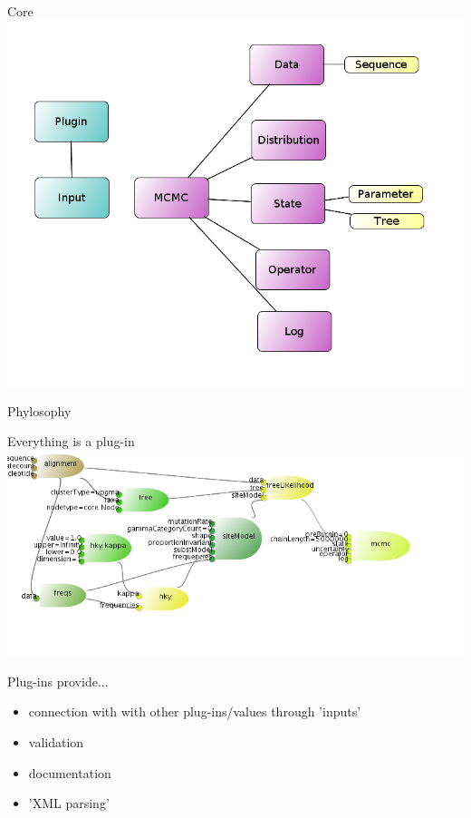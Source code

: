 \documentclass{beamer}
\theoremstyle{definition}
\begin{document}
\begin{frame}{Core}
\includegraphics[width=\textwidth]{BEAST.png}
\end{frame}

\begin{frame}[containsverbatim]
{\Large Phylosophy}

Everything is a plug-in
\vskip0.5cm
\includegraphics[width=\textwidth]{hkymodel.png}

Plug-ins provide...
\begin{itemize}
\item connection with with other plug-ins/values through 'inputs'
\item validation
\item documentation
\item 'XML parsing'
\end{itemize}
\end{frame}
\end{document}
